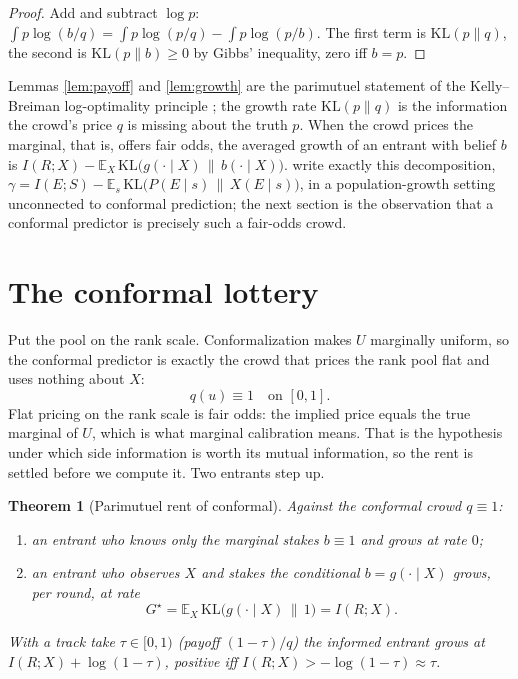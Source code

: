 \documentclass[11pt]{article}
\newtheorem{theorem}{Theorem}
\begin{document}
\begin{proof}
Add and subtract $\log p$: $\int p\log(b/q)=\int p\log(p/q)-\int p\log(p/b)$. The first term is
$\mathrm{KL}(p\|q)$, the second is $\mathrm{KL}(p\|b)\ge 0$ by Gibbs' inequality, zero iff $b=p$.
\end{proof}

Lemmas \ref{lem:payoff} and \ref{lem:growth} are the parimutuel statement of the Kelly--Breiman
log-optimality principle \citep{kelly1956,cover2006}; the growth rate $\mathrm{KL}(p\|q)$ is the
information the crowd's price $q$ is missing about the truth $p$. When the crowd prices the
marginal, that is, offers fair odds, the averaged growth of an entrant with belief $b$ is
$I(R;X)-\mathbb E_X\,\mathrm{KL}\big(g(\cdot\mid X)\,\|\,b(\cdot\mid X)\big)$. \citet{kemp2022}
write exactly this decomposition, $\gamma=I(E;S)-\mathbb E_s\,\mathrm{KL}\big(P(E\mid s)\,\|\,
X(E\mid s)\big)$, in a population-growth setting unconnected to conformal prediction; the next
section is the observation that a conformal predictor is precisely such a fair-odds crowd.

\section{The conformal lottery}

Put the pool on the rank scale. Conformalization makes $U$ marginally uniform, so the conformal
predictor is exactly the crowd that prices the rank pool flat and uses nothing about $X$:
\begin{equation}
q(u)\equiv 1 \quad\text{on } [0,1].
\end{equation}
Flat pricing on the rank scale is fair odds: the implied price equals the true marginal of $U$,
which is what marginal calibration means. That is the hypothesis under which side information is
worth its mutual information, so the rent is settled before we compute it. Two entrants step up.

\begin{theorem}[Parimutuel rent of conformal]\label{thm:rent}
Against the conformal crowd $q\equiv 1$:
\begin{enumerate}
\item[(i)] an entrant who knows only the marginal stakes $b\equiv 1$ and grows at rate $0$;
\item[(ii)] an entrant who observes $X$ and stakes the conditional $b=g(\cdot\mid X)$ grows, per
round, at rate
\begin{equation}
G^\star=\mathbb E_X\,\mathrm{KL}\!\big(g(\cdot\mid X)\,\big\|\,1\big)=I(R;X).
\end{equation}
\end{enumerate}
With a track take $\tau\in[0,1)$ (payoff $(1-\tau)/q$) the informed entrant grows at
$I(R;X)+\log(1-\tau)$, positive iff $I(R;X)>-\log(1-\tau)\approx\tau$.
\end{theorem}
\end{document}

